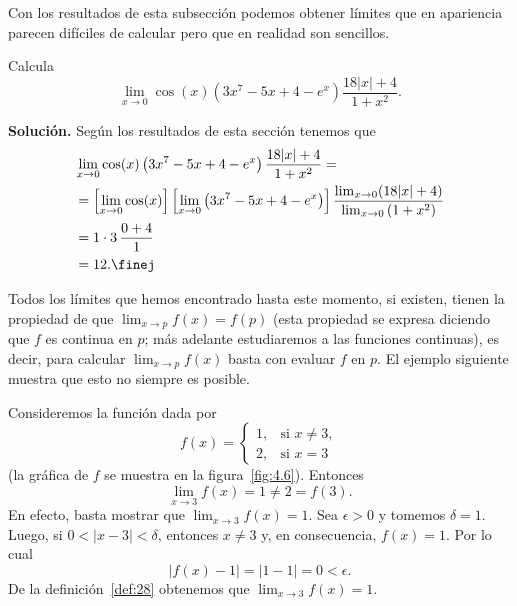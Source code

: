 \documentclass[12pt,a4paper]{book}
\begin{document}
    Con los resultados de esta subsección podemos obtener límites que en
    apariencia parecen difíciles de calcular pero que en realidad son sencillos.

    \begin{ejemplo}\label{ejm:49}
        Calcula
        \begin{equation*}
            \lim_{x\to 0}\cos(x)\left(3x^{7}-5x+4-e^{x}\right)\frac{18|x|+4}{1+x^{2}}.
        \end{equation*}

        \textbf{Solución.} Según los resultados de esta sección tenemos que
        \begin{align*}
            &\lim_{x\to 0}\cos(x)\left(3x^{7}-5x+4-e^{x}\right)\frac{18|x|+4}{1+x^{2}}=\\
            &=\left[\lim_{x\to 0}\cos(x)\right]\left[\lim_{x\to 0}\left(3x^{7}-5x+4-e^{x}\right)\right]\frac{\lim_{x\to 0}(18|x|+4)}{\lim_{x\to 0}\left(1+x^{2}\right)}\\
            &=1\cdot 3\,\frac{0+4}{1}\\
            &=12.\finej
        \end{align*}
    \end{ejemplo}

    Todos los límites que hemos encontrado hasta este momento, si existen,
    tienen la propiedad de que $\lim_{x\to p}f(x)=f(p)$ (esta propiedad se expresa
    diciendo que $f$ es continua en $p$; más adelante estudiaremos a las funciones
    continuas), es decir, para calcular $\lim_{x\to p}f(x)$ basta con evaluar $f$ en $p$. El
    ejemplo siguiente muestra que esto no siempre es posible.

    \begin{ejemplo}\label{ejm:50}
        Consideremos la función dada por
        \begin{equation*}
            f(x)=\begin{cases}
                1, & \text{si }x\neq 3,\\
                2, & \text{si }x=3
            \end{cases}
        \end{equation*}
        (la gráfica de $f$ se muestra en la figura~\ref{fig:4.6}). Entonces
        \begin{equation*}
            \lim_{x\to 3}f(x)=1\neq 2=f(3).
        \end{equation*}
        En efecto, basta mostrar que $\lim_{x\to 3}f(x)=1$. Sea $\epsilon>0$ y tomemos $\delta=1$.
        Luego, si $0<|x-3|<\delta$, entonces $x\neq 3$ y, en consecuencia, $f(x)=1$. Por
        lo cual
        \begin{equation*}
            |f(x)-1|=|1-1|=0<\epsilon.
        \end{equation*}
        De la definición~\ref{def:28} obtenemos que $\lim_{x\to 3}f(x)=1$.
    \end{ejemplo}
\end{document}
